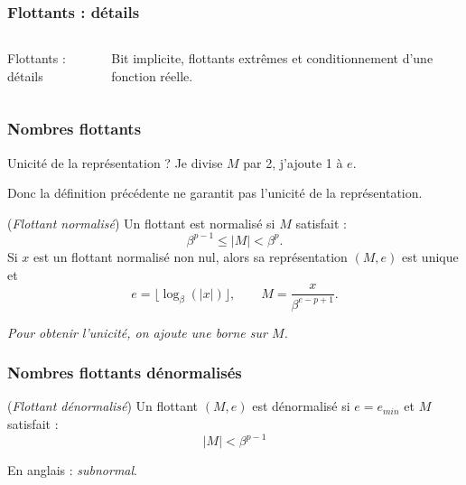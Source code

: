 \documentclass{beamer}
\begin{document}
\begin{frame}
\frametitle{Flottants : détails}
  \begin{columns}
    
    {\huge{Flottants : détails}}
	
	Bit implicite, flottants extrêmes et conditionnement 
	d'une fonction réelle.
  \end{columns}
\end{frame}


\begin{frame}
\frametitle{Nombres flottants}

Unicité de la représentation ? Je divise $M$ par 2, j'ajoute 1 à $e$.

Donc la définition précédente ne garantit pas l'unicité de la représentation. 


\begin{theorem}
(\emph{Flottant normalisé})
Un flottant est normalisé si $M$ satisfait :
$$
\beta^{p-1} \leq |M| < \beta^p.
$$
Si $x$ est un flottant normalisé non nul, alors sa représentation $(M,e)$ 
est unique et 
$$
e = \lfloor \log_\beta(|x|) \rfloor, \qquad 
M = \frac{x}{\beta^{e-p+1}}.
$$
\end{theorem}

\emph{Pour obtenir l'unicité, on ajoute une borne sur $M$.}

\end{frame}


\begin{frame}
\frametitle{Nombres flottants dénormalisés}

\begin{definition}
(\emph{Flottant dénormalisé})
Un flottant $(M,e)$ est dénormalisé si $e=e_{min}$ et $M$ satisfait :
$$
|M| < \beta^{p-1}
$$
\end{definition}

En anglais : \emph{subnormal}.

\end{frame}

\end{document}
